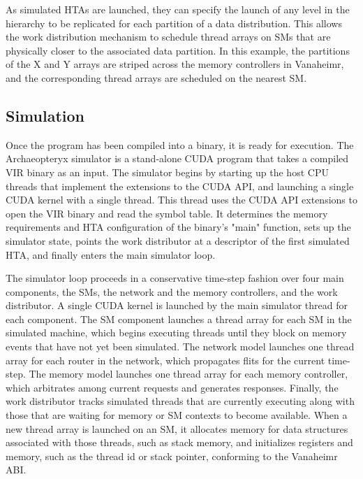 \documentclass[conference, 10pt]{IEEEtran}
\begin{document}
As simulated HTAs are launched, they can specify the launch of any level in the
hierarchy to be replicated for each partition of a data distribution.  This
allows the work distribution mechanism to schedule thread arrays on SMs that
are physically closer to the associated data partition.  In this example, the
partitions of the X and Y arrays are striped across the memory controllers in
Vanaheimr, and the corresponding thread arrays are scheduled on the nearest SM.

\subsection{Simulation}

Once the program has been compiled into a binary, it is ready for execution. 
The Archaeopteryx simulator is a stand-alone CUDA program that takes a compiled
VIR binary as an input.  The simulator begins by starting up the host CPU
threads that implement the extensions to the CUDA API, and launching a single
CUDA kernel with a single thread.   This thread uses the CUDA API extensions to
open the VIR binary and read the symbol table.  It determines the memory
requirements and HTA configuration of the binary's "main" function, sets up the
simulator state, points the work distributor at a descriptor of the first
simulated HTA, and finally enters the main simulator loop.  

The simulator loop proceeds in a conservative
time-step fashion over four main components, the SMs, the network and the
memory controllers, and the work distributor.  A single CUDA kernel is launched
by the main simulator thread for each component.  The SM component launches a
thread array for each SM in the simulated machine, which begins executing
threads until they block on memory events that have not yet been simulated. 
The network model launches one thread array for each router in the network,
which propagates flits for the current time-step.  The memory model launches one
thread array for each memory controller, which arbitrates among current requests
and generates responses.  Finally, the work distributor tracks simulated threads
that are currently executing along with those that are waiting for memory or
SM contexts to become available.  When a new thread array is launched on an SM,
it allocates memory for data structures associated with those threads, such as
stack memory, and initializes registers and memory, such as the thread id or
stack pointer, conforming to the Vanaheimr ABI.
\end{document}
